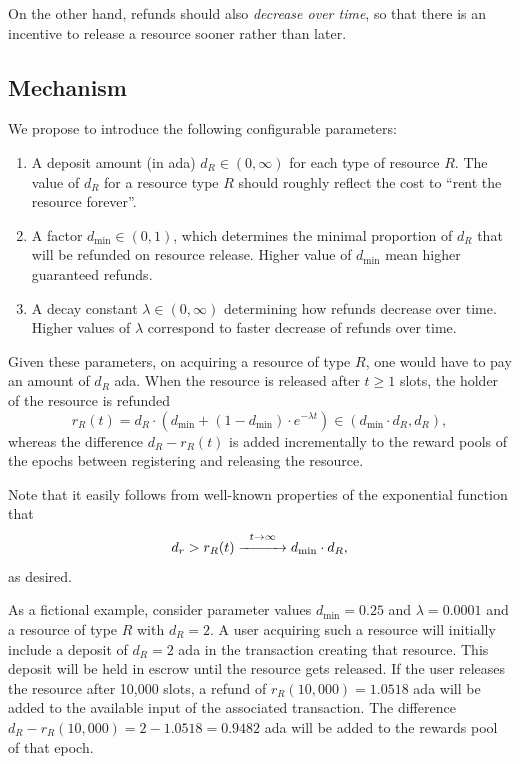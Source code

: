 \documentclass[11pt,a4paper,dvipsnames,twosided]{article}
\begin{document}
On the other hand, refunds should also \emph{decrease over time}, so that
there is an incentive to release a resource sooner rather than later.

\subsection{Mechanism}

We propose to introduce the following configurable parameters:
\begin{enumerate}
    \item
        A deposit amount (in ada) $d_R\in(0,\infty)$ for each type of resource
        $R$. The value of $d_R$ for a resource type $R$ should roughly reflect
        the cost to ``rent the resource forever''.
    \item
        A factor $d_{\min}\in(0,1)$, which determines the minimal proportion of
        $d_R$ that will be refunded on resource release. Higher value of
        $d_{\min}$ mean higher guaranteed refunds.
    \item
        A decay constant $\lambda\in(0,\infty)$ determining how refunds decrease
        over time. Higher values of $\lambda$ correspond to faster decrease of
        refunds over time.
\end{enumerate}

Given these parameters, on acquiring a resource of type $R$, one would have to
pay an amount of $d_R$ ada\@. When the resource is released after $t\geq 1$ slots,
the holder of the resource is refunded
\[
    r_R(t)=d_R\cdot\left(d_{\min}+(1-d_{\min})\cdot e^{-\lambda t}\right)\in(d_{\min}\cdot d_R,d_R),
\]
whereas the difference $d_R-r_R(t)$ is added incrementally to the reward pools of
the epochs between registering and releasing the resource.

Note that it easily follows from well-known properties of the exponential
function that
\[
    d_r>r_R(t)\stackrel{t\rightarrow\infty}{\xrightarrow{\hspace{10mm}}}d_{\min}\cdot d_R,
\]
as desired.

As a fictional example, consider parameter values $d_{\min}=0.25$ and $\lambda=0.0001$
and a resource of type $R$ with $d_R=2$. A user acquiring such a resource
will initially include a deposit of $d_R=2$ ada in the transaction creating that
resource. This deposit will be held in escrow until the resource gets released.
If the user releases the resource after 10,000 slots, a refund of
$r_R(10,000)=1.0518$ ada will be added to the available input of the associated
transaction. The difference $d_R-r_R(10,000)=2-1.0518=0.9482$ ada will be added
to the rewards pool of that epoch.
\end{document}
